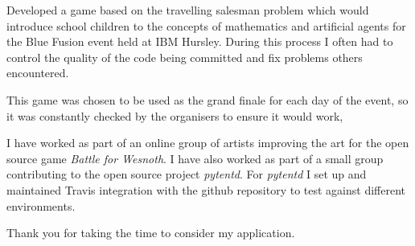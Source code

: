 \documentclass[10pt,stdletter,dateno,sigleft]{newlfm} %
\begin{document}
\begin{newlfm}





Developed a game based on the travelling salesman problem which would introduce
school children to the concepts of mathematics and artificial agents for the
Blue Fusion event held at IBM Hursley. During this process I often had to 
control the quality of the code being committed and fix problems others 
encountered.

This game was chosen to be used as the grand finale for each day of the event,
so it was constantly checked by the organisers to ensure it would work, 

I have worked as part of an online group of artists improving the art for the
open source game \textit{Battle for Wesnoth}. I have also worked as part of a small 
group contributing to the open source project \textit{pytentd}. For \textit{pytentd} I
set up and maintained Travis integration with the github repository to test against
different environments.




 

Thank you for taking the time to consider my application.


\end{newlfm}
\end{document}
